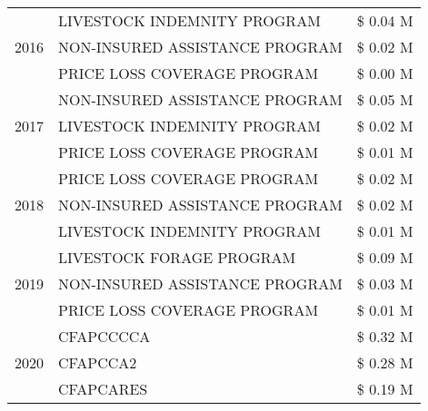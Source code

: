 \begin{tabular}{llr}
\cline{1-3}
\multirow[t]{3}{*}{2016} & LIVESTOCK INDEMNITY PROGRAM & \$ 0.04 M \\
 & NON-INSURED ASSISTANCE PROGRAM & \$ 0.02 M \\
 & PRICE LOSS COVERAGE PROGRAM & \$ 0.00 M \\
\cline{1-3}
\multirow[t]{3}{*}{2017} & NON-INSURED ASSISTANCE PROGRAM & \$ 0.05 M \\
 & LIVESTOCK INDEMNITY PROGRAM & \$ 0.02 M \\
 & PRICE LOSS COVERAGE PROGRAM & \$ 0.01 M \\
\cline{1-3}
\multirow[t]{3}{*}{2018} & PRICE LOSS COVERAGE PROGRAM & \$ 0.02 M \\
 & NON-INSURED ASSISTANCE PROGRAM & \$ 0.02 M \\
 & LIVESTOCK INDEMNITY PROGRAM & \$ 0.01 M \\
\cline{1-3}
\multirow[t]{3}{*}{2019} & LIVESTOCK FORAGE PROGRAM & \$ 0.09 M \\
 & NON-INSURED ASSISTANCE PROGRAM & \$ 0.03 M \\
 & PRICE LOSS COVERAGE PROGRAM & \$ 0.01 M \\
\cline{1-3}
\multirow[t]{3}{*}{2020} & CFAPCCCCA & \$ 0.32 M \\
 & CFAPCCA2 & \$ 0.28 M \\
 & CFAPCARES & \$ 0.19 M \\
\cline{1-3}
\bottomrule
\end{tabular}

